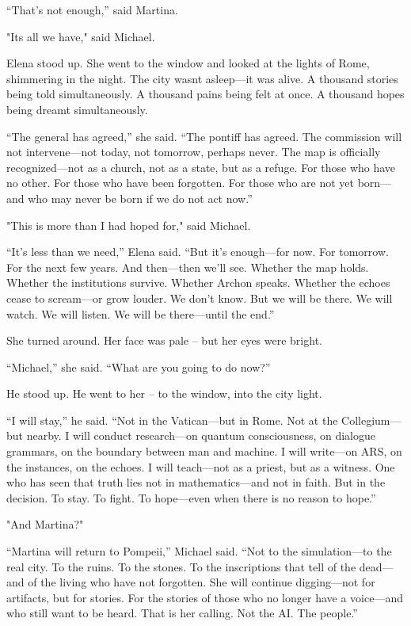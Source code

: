 \documentclass[
]{article}
\begin{document}
``That's not enough,'' said Martina.

"It\textquotesingle s all we have," said Michael.

Elena stood up. She went to the window and looked at the lights of Rome, shimmering in the night. The city wasn\textquotesingle t asleep---it was alive. A thousand stories being told simultaneously. A thousand pains being felt at once. A thousand hopes being dreamt simultaneously.

``The general has agreed,'' she said. ``The pontiff has agreed. The commission will not intervene---not today, not tomorrow, perhaps never. The map is officially recognized---not as a church, not as a state, but as a refuge. For those who have no other. For those who have been forgotten. For those who are not yet born---and who may never be born if we do not act now.''

"This is more than I had hoped for," said Michael.

``It's less than we need,'' Elena said. ``But it's enough---for now. For tomorrow. For the next few years. And then---then we'll see. Whether the map holds. Whether the institutions survive. Whether Archon speaks. Whether the echoes cease to scream---or grow louder. We don't know. But we will be there. We will watch. We will listen. We will be there---until the end.''

She turned around. Her face was pale -- but her eyes were bright.

``Michael,'' she said. ``What are you going to do now?''

He stood up. He went to her -- to the window, into the city light.

``I will stay,'' he said. ``Not in the Vatican---but in Rome. Not at the Collegium---but nearby. I will conduct research---on quantum consciousness, on dialogue grammars, on the boundary between man and machine. I will write---on ARS, on the instances, on the echoes. I will teach---not as a priest, but as a witness. One who has seen that truth lies not in mathematics---and not in faith. But in the decision. To stay. To fight. To hope---even when there is no reason to hope.''

"And Martina?"

``Martina will return to Pompeii,'' Michael said. ``Not to the simulation---to the real city. To the ruins. To the stones. To the inscriptions that tell of the dead---and of the living who have not forgotten. She will continue digging---not for artifacts, but for stories. For the stories of those who no longer have a voice---and who still want to be heard. That is her calling. Not the AI. The people.''
\end{document}
